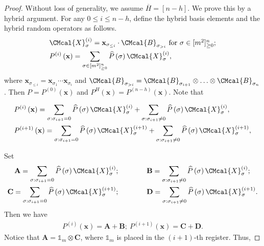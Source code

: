 \documentclass[10pt,a4paper]{article}
\def\B{\CMcal{B}}
\def\X{\CMcal{X}}
\theoremstyle{plain}
\theoremstyle{definition}
\newcommand {\br} [1] {\ensuremath{ \left( #1 \right) }}
\newcommand {\id} {\ensuremath{\mathds{1}}}
\newcommand{\randx}{\ensuremath{\mathbf{x}}}
\newcommand{\1}{\mathbb{1}} %
\begin{document}
\begin{proof}
Without loss of generality, we assume $\overline{H}=[n-h]$. We prove this by a hybrid argument. For any $0\leq i\leq n-h$, define the hybrid basis elements and the hybrid random operators as follows.
	\begin{align}
	&\X_{\sigma}^{\br{i}}=\randx_{\sigma_{\leq i}}\cdot\B_{\sigma_{>i}}~\mbox{for $\sigma\in[m^2]_{\geq 0}^n$};\label{eqn:hybridxi}\\
	&P^{\br{i}}\br{\randx}=\sum_{\sigma\in[m^2]^n_{\geq0}}\widehat{P}\br{\sigma}\X^{\br{i}}_{\sigma},\label{eqn:hybridmi}
	\end{align}
where $\randx_{\sigma_{\leq i}}=\randx_{\sigma_1}\cdots\randx_{\sigma_i}$
and $\B_{\sigma_{>i}}=\B_{\sigma_{i+1}}\otimes\ldots\otimes\B_{\sigma_n}$.
Then $P=P^{(0)}\br{\randx}$ and $P^{H}\br{\randx}=P^{(n-h)}\br{\randx}$. Note that
	
	
	\begin{align*}
	&P^{\br{i}}\br{\randx}=\sum_{\sigma:\sigma_{i+1}=0}\widehat{P}\br{\sigma}\X_{\sigma}^{\br{i}}+\sum_{\sigma:\sigma_{i+1}\neq 0}\widehat{P}\br{\sigma}\X_{\sigma}^{\br{i}},\\
	&P^{\br{i+1}}\br{\randx}=\sum_{\sigma:\sigma_{i+1}= 0}\widehat{P}\br{\sigma}\X_{\sigma}^{\br{i+1}}+\sum_{\sigma:\sigma_{i+1}\neq 0}\widehat{P}\br{\sigma}\X_{\sigma}^{\br{i+1}},
	\end{align*}

	Set
	\begin{align*}
	\mathbf{A}=\sum_{\sigma:\sigma_{i+1}=0}\widehat{P}\br{\sigma}\X_{\sigma}^{\br{i}}; \quad\quad\quad\quad
	&\mathbf{B}=\sum_{\sigma:\sigma_{i+1}\neq 0}\widehat{P}\br{\sigma}\X_{\sigma}^{\br{i}};\\
\mathbf{C}=\sum_{\sigma:\sigma_{i+1}=0}\widehat{P}\br{\sigma}\X_{\sigma}^{\br{i+1}};\quad\quad\quad\quad
	&\mathbf{D}=\sum_{\sigma:\sigma_{i+1}\neq 0}\widehat{P}\br{\sigma}\X_{\sigma}^{\br{i+1}}.
	\end{align*}
	Then we have
	\begin{align*}
	P^{\br{i}}\br{\randx}=\mathbf{A}+\mathbf{B};~P^{\br{i+1}}\br{\randx}=\mathbf{C}+\mathbf{D}.
	\end{align*}
Notice that $\mathbf{A}=\id_m\otimes\mathbf{C}$, where $\id_m$ is placed in the $(i+1)$-th register. Thus,


\end{proof}
\end{document}

